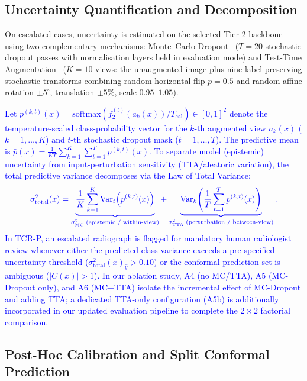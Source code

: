\documentclass[diagnostics,article,submit,moreauthors]{Definitions/mdpi}
\newcommand{\rev}[1]{\textcolor{blue}{#1}}
\begin{document}
\subsection{Uncertainty Quantification and Decomposition}

On escalated cases, uncertainty is estimated on the selected Tier-2 backbone using two complementary mechanisms: Monte~Carlo Dropout~\cite{gal2016dropout} ($T=20$ stochastic dropout passes with normalisation layers held in evaluation mode) and Test-Time Augmentation~\cite{wang2019aleatoric} ($K=10$ views: the unaugmented image plus nine label-preserving stochastic transforms combining random horizontal flip $p=0.5$ and random affine rotation $\pm 5^\circ$, translation $\pm 5\%$, scale $0.95$--$1.05$).

\rev{Let $p^{(k,t)}(x) = \mathrm{softmax}(f_2^{(t)}(a_k(x)) / T_{\text{cal}}) \in [0,1]^2$ denote the temperature-scaled class-probability vector for the $k$-th augmented view $a_k(x)$ ($k=1,\dots,K$) and $t$-th stochastic dropout mask ($t=1,\dots,T$). The predictive mean is $\bar{p}(x) = \frac{1}{KT}\sum_{k=1}^K\sum_{t=1}^T p^{(k,t)}(x)$. To separate model (epistemic) uncertainty from input-perturbation sensitivity (TTA/aleatoric variation), the total predictive variance decomposes via the Law of Total Variance:}
\begin{equation}
\rev{\sigma^2_{\text{total}}(x) = \underbrace{\frac{1}{K}\sum_{k=1}^{K}\operatorname{Var}_{t}\!\left(p^{(k,t)}(x)\right)}_{\sigma^2_{\text{MC}}\;\text{(epistemic / within-view)}} + \underbrace{\operatorname{Var}_{k}\!\left(\frac{1}{T}\sum_{t=1}^{T} p^{(k,t)}(x)\right)}_{\sigma^2_{\text{TTA}}\;\text{(perturbation / between-view)}}.}
\label{eq:var_decomp}
\end{equation}
\rev{In TCR-P, an escalated radiograph is flagged for mandatory human radiologist review whenever either the predicted-class variance exceeds a pre-specified uncertainty threshold ($\sigma^2_{\text{total}}(x)_{\hat{y}} > 0.10$) or the conformal prediction set is ambiguous ($|C(x)| > 1$). In our ablation study, A4 (no MC/TTA), A5 (MC-Dropout only), and A6 (MC+TTA) isolate the incremental effect of MC-Dropout and adding TTA; a dedicated TTA-only configuration (A5b) is additionally incorporated in our updated evaluation pipeline to complete the $2\times 2$ factorial comparison.}

\subsection{Post-Hoc Calibration and Split Conformal Prediction}
\end{document}
